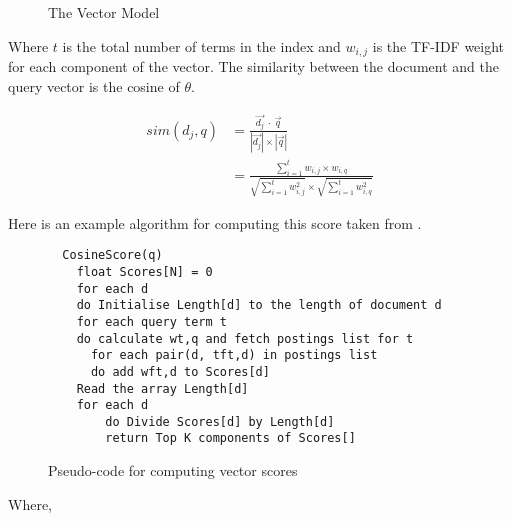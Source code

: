 \begin{figure}[htb] %
  \centering
\caption[Vector Model]{The Vector Model}
\label{fig:VM}
\end{figure}

Where $t$ is the total number of terms in the index and $w_{i,j}$ is the TF-IDF weight for each component of the vector. The similarity between the document and the query vector is the cosine of $\theta$.

\begin{equation}
  \begin{split}
  sim(d_j,q) &= \frac{\vec{d_j} \ \cdot \ \vec{q}}{|\vec{d_j}| \times |\vec{q}|}\\
  &= \frac{\sum_{i=1}^{t}w_{i,j} \times w_{i,q}}
  {\sqrt{\sum_{i=1}^{t}w_{i,j}^{2}} \times \sqrt{\sum_{i=1}^{t}w_{i,q}^{2}}}
  \end{split}
  \label{eq:sim2}
\end{equation}

Here is an example algorithm for computing this score taken from \citep[p.125]{Manning2009}.

\begin{figure}[htb]
  \begin{lstlisting}
  CosineScore(q)
    float Scores[N] = 0
    for each d
    do Initialise Length[d] to the length of document d
    for each query term t
    do calculate wt,q and fetch postings list for t
      for each pair(d, tft,d) in postings list
      do add wft,d to Scores[d]
    Read the array Length[d]
    for each d
    	do Divide Scores[d] by Length[d]
    	return Top K components of Scores[]
  \end{lstlisting}
\caption[Pseudo-code for computing vector scores]{Pseudo-code for computing vector scores}
\label{fig:VectorScores}
\end{figure}

Where,\\
 \\
 \\
 \\
 \\
 \\
 \\
 \\
 \\
 

